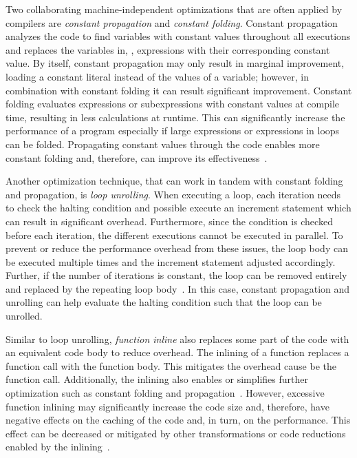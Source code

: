Two collaborating machine-independent optimizations that are often applied by compilers are \emph{constant propagation} and \emph{constant folding}. Constant propagation analyzes the code to find variables with constant values throughout all executions and replaces the variables in, \eg, expressions with their corresponding constant value. By itself, constant propagation may only result in marginal improvement, loading a constant literal instead of the values of a variable; however, in combination with constant folding it can result significant improvement. Constant folding evaluates expressions or subexpressions with constant values at compile time, resulting in less calculations at runtime. This can significantly increase the performance of a program especially if large expressions or expressions in loops can be folded. Propagating constant values through the code enables more constant folding and, therefore, can improve its effectiveness~\cite{WeZa91}.

Another optimization technique, that can work in tandem with constant folding and propagation, is \emph{loop unrolling}. When executing a loop, each iteration needs to check the halting condition and possible execute an increment statement which can result in significant overhead. Furthermore, since the condition is checked before each iteration, the different executions cannot be executed in parallel. To prevent or reduce the performance overhead from these issues, the loop body can be executed multiple times and the increment statement adjusted accordingly. Further, if the number of iterations is constant, the loop can be removed entirely and replaced by the repeating loop body~\cite{HuLe99}. In this case, constant propagation and unrolling can help evaluate the halting condition such that the loop can be unrolled. 

Similar to loop unrolling, \emph{function inline} also replaces some part of the code with an equivalent code body to reduce overhead. The inlining of a function replaces a function call with the function body. This mitigates the overhead cause be the function call. Additionally, the inlining also enables or simplifies further optimization such as constant folding and propagation~\cite{TGS22}. However, excessive function inlining may significantly increase the code size and, therefore, have negative effects on the caching of the code and, in turn, on the performance. This effect can be decreased or mitigated by other transformations or code reductions enabled by the inlining~\cite{PeMa02}.

